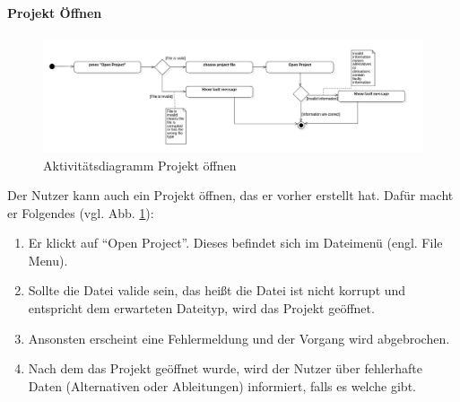 \documentclass{article}
\begin{document}
\paragraph{Projekt Öffnen}\mbox{}
\begin{figure}[H]%
    \centering
    \includegraphics[width=13cm]{entwurf/Entwurf_dokument/img/Alissa/OpenProjectAD.png}
    \caption{Aktivitätsdiagramm Projekt öffnen}
    \label{ADProjektÖffnen}
\end{figure}
Der Nutzer kann auch ein Projekt öffnen, das er vorher erstellt hat. Dafür macht er Folgendes (vgl. Abb. \ref{ADProjektÖffnen}):
\begin{enumerate}
    \item[1.] Er klickt auf \enquote{Open Project}. Dieses befindet sich im Dateimenü (engl. File Menu).
    \item[2.] Sollte die Datei valide sein, das heißt die Datei ist nicht korrupt und entspricht dem erwarteten Dateityp, wird das Projekt geöffnet.
    \item[3.] Ansonsten erscheint eine Fehlermeldung und der Vorgang wird abgebrochen.
    \item[4.] Nach dem das Projekt geöffnet wurde, wird der Nutzer über fehlerhafte Daten (Alternativen oder Ableitungen) informiert, falls es welche gibt. 
\end{enumerate}
\end{document}

